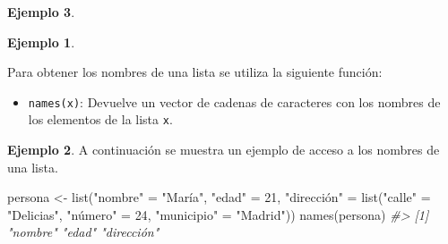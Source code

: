\documentclass[
]{book}
\newenvironment{Shaded}{\begin{snugshade}}{\end{snugshade}}
\newcommand{\CommentTok}[1]{\textcolor[rgb]{0.56,0.35,0.01}{\textit{#1}}}
\newcommand{\DecValTok}[1]{\textcolor[rgb]{0.00,0.00,0.81}{#1}}
\newcommand{\FunctionTok}[1]{\textcolor[rgb]{0.00,0.00,0.00}{#1}}
\newcommand{\NormalTok}[1]{#1}
\newcommand{\OtherTok}[1]{\textcolor[rgb]{0.56,0.35,0.01}{#1}}
\newcommand{\StringTok}[1]{\textcolor[rgb]{0.31,0.60,0.02}{#1}}
\providecommand{\tightlist}{%
  \setlength{\itemsep}{0pt}\setlength{\parskip}{0pt}}
\theoremstyle{definition}
\theoremstyle{definition}
\newtheorem{example}{Ejemplo}[chapter]
\theoremstyle{definition}
\theoremstyle{definition}
\theoremstyle{remark}
\begin{document}
\begin{example}
\begin{example}
\begin{Shaded}
\end{Shaded}

\end{example}

Para obtener los nombres de una lista se utiliza la siguiente función:

\begin{itemize}
\tightlist
\item
  \texttt{names(x)}: Devuelve un vector de cadenas de caracteres con los nombres de los elementos de la lista \texttt{x}.
\end{itemize}

\begin{example}

A continuación se muestra un ejemplo de acceso a los nombres de una lista.

\begin{Shaded}
\begin{Highlighting}[]
\NormalTok{persona }\OtherTok{\textless{}{-}} \FunctionTok{list}\NormalTok{(}\StringTok{"nombre"} \OtherTok{=} \StringTok{"María"}\NormalTok{, }\StringTok{"edad"} \OtherTok{=} \DecValTok{21}\NormalTok{, }\StringTok{"dirección"} \OtherTok{=} \FunctionTok{list}\NormalTok{(}\StringTok{"calle"} \OtherTok{=} \StringTok{"Delicias"}\NormalTok{, }\StringTok{"número"} \OtherTok{=} \DecValTok{24}\NormalTok{, }\StringTok{"municipio"} \OtherTok{=} \StringTok{"Madrid"}\NormalTok{))}
\FunctionTok{names}\NormalTok{(persona)}
\CommentTok{\#\textgreater{} [1] "nombre"    "edad"      "dirección"}
\end{Highlighting}
\end{Shaded}


\end{example}
\end{example}
\end{document}
